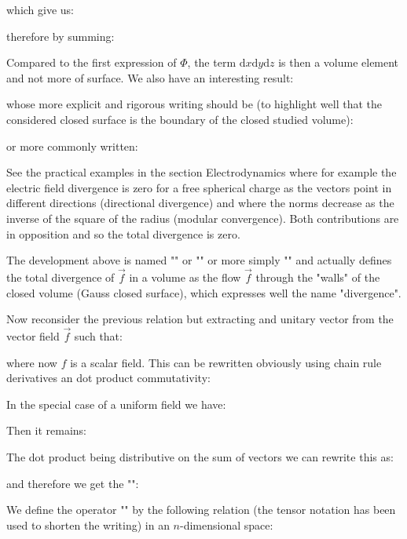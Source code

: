 	which give us:
	
	therefore by summing:
	
	Compared to the first expression of $\Phi$, the term $\mathrm{d}x\mathrm{d}y\mathrm{d}z$ is then a volume element and not more of surface. We also have an interesting result:
	
	whose more explicit and rigorous writing  should be (to highlight well that the considered closed surface is the boundary of the closed studied volume):
	
	or more commonly written:
	
	\begin{tcolorbox}[title=Remark,colframe=black,arc=10pt]
	See the practical examples in the section Electrodynamics where for example the electric field divergence is zero for a free spherical charge as the vectors point in different directions (directional divergence) and where the norms decrease as the inverse of the square of the radius (modular convergence). Both contributions are in opposition and so the total divergence is zero.
	\end{tcolorbox}
	The development above is named "" or "" or more simply "" and actually defines the total divergence of $\vec{f}$ in a volume as the flow $\vec{f}$ through the "walls" of the closed volume (Gauss closed surface), which expresses well the name "divergence".
	
	Now reconsider the previous relation but extracting and unitary vector from the vector field $\vec{f}$ such that:
	
	where now $f$ is a scalar field. This can be rewritten obviously using chain rule derivatives an dot product commutativity:
	
	In the special case of a uniform field we have:
	
	Then it remains:
	
	The dot product being distributive on the sum of vectors we can rewrite this as:
	
	and therefore we get the "":
	
	
	We define the operator "" by the following relation (the tensor notation has been used to shorten the writing) in an $n$-dimensional space:
	
